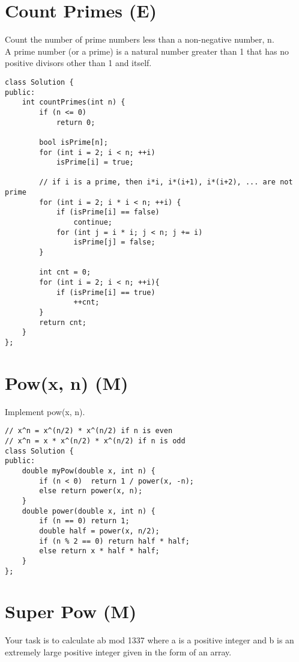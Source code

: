 \section{Count Primes (E)}
Count the number of prime numbers less than a non-negative number, n. \\
A prime number (or a prime) is a natural number greater than 1 that has no positive divisors other than 1 and itself. \\

\begin{lstlisting}
class Solution {
public:
    int countPrimes(int n) {
        if (n <= 0) 
            return 0;
        
        bool isPrime[n];
        for (int i = 2; i < n; ++i)
            isPrime[i] = true;
            
        // if i is a prime, then i*i, i*(i+1), i*(i+2), ... are not prime
        for (int i = 2; i * i < n; ++i) {
            if (isPrime[i] == false)    
                continue;
            for (int j = i * i; j < n; j += i)  
                isPrime[j] = false;
        }
        
        int cnt = 0;
        for (int i = 2; i < n; ++i){
            if (isPrime[i] == true)
                ++cnt;
        }
        return cnt;
    }
};
\end{lstlisting}


\section{Pow(x, n) (M)}
Implement pow(x, n). \\

\begin{lstlisting}
// x^n = x^(n/2) * x^(n/2) if n is even
// x^n = x * x^(n/2) * x^(n/2) if n is odd
class Solution {
public:
    double myPow(double x, int n) {
        if (n < 0)  return 1 / power(x, -n);
        else return power(x, n);
    }
    double power(double x, int n) {
        if (n == 0) return 1;
        double half = power(x, n/2);
        if (n % 2 == 0) return half * half;
        else return x * half * half;
    }
};
\end{lstlisting}


\section{Super Pow (M)}
Your task is to calculate ab mod 1337 where a is a positive integer and b is an extremely large positive integer given in the form of an array. \\
 

